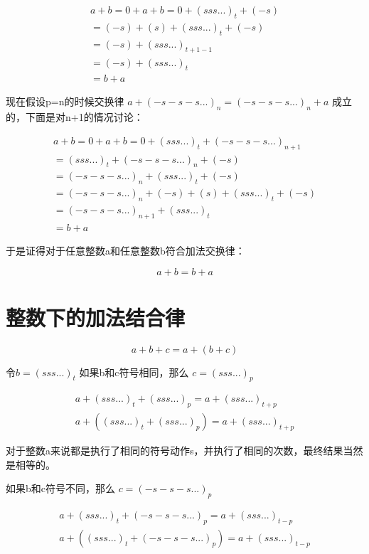 \documentclass[12pt,oneside]{book}
\begin{document}
\begin{align*}
a + b = 0 + a +b = 0 + (sss...)_t + (-s)\\
=(-s) + (s) + (sss...)_{t} + (-s)\\
= (-s) + (sss...)_{t+1-1}\\
= (-s) + (sss...)_t\\
= b+a
\end{align*}

现在假设p=n的时候交换律 $a+(-s-s-s...)_n=(-s-s-s...)_n+a$ 成立的，下面是对n+1的情况讨论：

\begin{align*}
a + b = 0 + a +b = 0 + (sss...)_t + (-s-s-s...)_{n+1}\\
=(sss...)_{t} +(-s-s-s...)_{n} + (-s)\\
= (-s-s-s...)_{n} + (sss...)_{t} + (-s)\\
= (-s-s-s...)_{n} + (-s) + (s) + (sss...)_t + (-s)\\
= (-s-s-s...)_{n+1} + (sss...)_t\\
= b + a
\end{align*}

于是证得对于任意整数a和任意整数b符合加法交换律：

\begin{equation}
a+ b = b+ a
\end{equation}



\section{整数下的加法结合律}
\begin{equation}
a + b + c = a + (b + c)
\end{equation}

令$b=(sss...)_t$  如果b和c符号相同，那么 $c=(sss...)_p$

\begin{align}
a + (sss...)_t + (sss...)_p = a+ (sss...)_{t+p}\\
a + ((sss...)_t + (sss...)_p) = a+ (sss...)_{t+p}
\end{align}

对于整数a来说都是执行了相同的符号动作s，并执行了相同的次数，最终结果当然是相等的。

如果b和c符号不同，那么 $c=(-s-s-s...)_p$

\begin{align}
a + (sss...)_t + (-s-s-s...)_p = a+ (sss...)_{t-p}\\
a + ((sss...)_t + (-s-s-s...)_p) = a+ (sss...)_{t-p}
\end{align}
\end{document}
